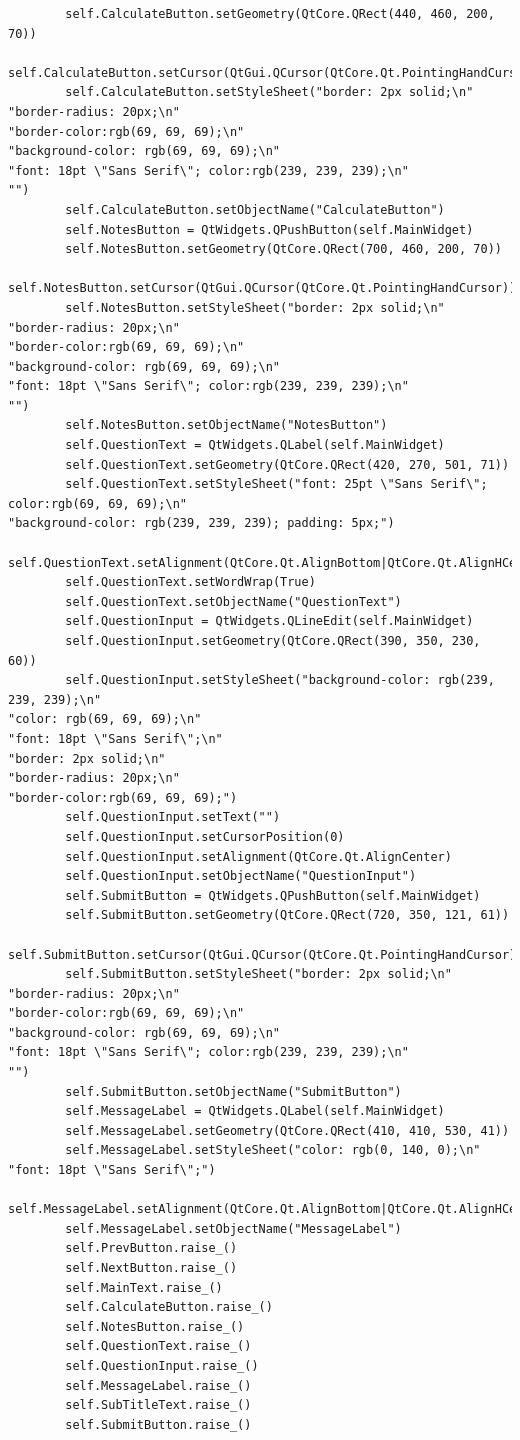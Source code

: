 \documentclass[12pt]{article}
\begin{document}
\begin{lstlisting}
        self.CalculateButton.setGeometry(QtCore.QRect(440, 460, 200, 70))
        self.CalculateButton.setCursor(QtGui.QCursor(QtCore.Qt.PointingHandCursor))
        self.CalculateButton.setStyleSheet("border: 2px solid;\n"
"border-radius: 20px;\n"
"border-color:rgb(69, 69, 69);\n"
"background-color: rgb(69, 69, 69);\n"
"font: 18pt \"Sans Serif\"; color:rgb(239, 239, 239);\n"
"")
        self.CalculateButton.setObjectName("CalculateButton")
        self.NotesButton = QtWidgets.QPushButton(self.MainWidget)
        self.NotesButton.setGeometry(QtCore.QRect(700, 460, 200, 70))
        self.NotesButton.setCursor(QtGui.QCursor(QtCore.Qt.PointingHandCursor))
        self.NotesButton.setStyleSheet("border: 2px solid;\n"
"border-radius: 20px;\n"
"border-color:rgb(69, 69, 69);\n"
"background-color: rgb(69, 69, 69);\n"
"font: 18pt \"Sans Serif\"; color:rgb(239, 239, 239);\n"
"")
        self.NotesButton.setObjectName("NotesButton")
        self.QuestionText = QtWidgets.QLabel(self.MainWidget)
        self.QuestionText.setGeometry(QtCore.QRect(420, 270, 501, 71))
        self.QuestionText.setStyleSheet("font: 25pt \"Sans Serif\"; color:rgb(69, 69, 69);\n"
"background-color: rgb(239, 239, 239); padding: 5px;")
        self.QuestionText.setAlignment(QtCore.Qt.AlignBottom|QtCore.Qt.AlignHCenter)
        self.QuestionText.setWordWrap(True)
        self.QuestionText.setObjectName("QuestionText")
        self.QuestionInput = QtWidgets.QLineEdit(self.MainWidget)
        self.QuestionInput.setGeometry(QtCore.QRect(390, 350, 230, 60))
        self.QuestionInput.setStyleSheet("background-color: rgb(239, 239, 239);\n"
"color: rgb(69, 69, 69);\n"
"font: 18pt \"Sans Serif\";\n"
"border: 2px solid;\n"
"border-radius: 20px;\n"
"border-color:rgb(69, 69, 69);")
        self.QuestionInput.setText("")
        self.QuestionInput.setCursorPosition(0)
        self.QuestionInput.setAlignment(QtCore.Qt.AlignCenter)
        self.QuestionInput.setObjectName("QuestionInput")
        self.SubmitButton = QtWidgets.QPushButton(self.MainWidget)
        self.SubmitButton.setGeometry(QtCore.QRect(720, 350, 121, 61))
        self.SubmitButton.setCursor(QtGui.QCursor(QtCore.Qt.PointingHandCursor))
        self.SubmitButton.setStyleSheet("border: 2px solid;\n"
"border-radius: 20px;\n"
"border-color:rgb(69, 69, 69);\n"
"background-color: rgb(69, 69, 69);\n"
"font: 18pt \"Sans Serif\"; color:rgb(239, 239, 239);\n"
"")
        self.SubmitButton.setObjectName("SubmitButton")
        self.MessageLabel = QtWidgets.QLabel(self.MainWidget)
        self.MessageLabel.setGeometry(QtCore.QRect(410, 410, 530, 41))
        self.MessageLabel.setStyleSheet("color: rgb(0, 140, 0);\n"
"font: 18pt \"Sans Serif\";")
        self.MessageLabel.setAlignment(QtCore.Qt.AlignBottom|QtCore.Qt.AlignHCenter)
        self.MessageLabel.setObjectName("MessageLabel")
        self.PrevButton.raise_()
        self.NextButton.raise_()
        self.MainText.raise_()
        self.CalculateButton.raise_()
        self.NotesButton.raise_()
        self.QuestionText.raise_()
        self.QuestionInput.raise_()
        self.MessageLabel.raise_()
        self.SubTitleText.raise_()
        self.SubmitButton.raise_()


\end{lstlisting}
\end{document}
